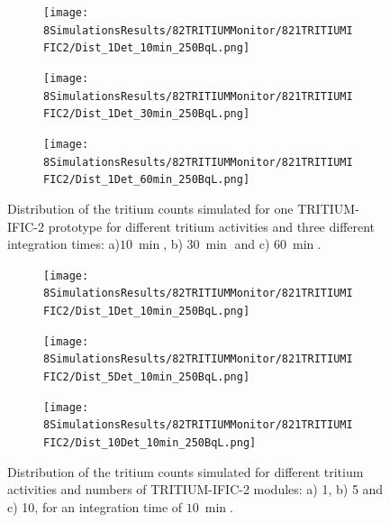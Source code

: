 \begin{figure}
\centering
    \begin{subfigure}[b]{0.6\textwidth}
    \centering
    \texttt{[image: 8SimulationsResults/82TRITIUMMonitor/821TRITIUMIFIC2/Dist\_1Det\_10min\_250BqL.png]}  
    \caption{\label{subfig:1Det10min250BqLST}}
    \end{subfigure}
    \hfill
    \begin{subfigure}[b]{0.6\textwidth}
    \centering
    \texttt{[image: 8SimulationsResults/82TRITIUMMonitor/821TRITIUMIFIC2/Dist\_1Det\_30min\_250BqL.png]}  
    \caption{\label{subfig:1Det30min250BqLST}}
    \end{subfigure}
    \hfill
    \begin{subfigure}[b]{0.6\textwidth}
    \centering
    \texttt{[image: 8SimulationsResults/82TRITIUMMonitor/821TRITIUMIFIC2/Dist\_1Det\_60min\_250BqL.png]}  
    \caption{\label{subfig:1Det60min250BqLST}}
    \end{subfigure}
 \caption{Distribution of the tritium counts simulated for one TRITIUM-IFIC-2 prototype for different tritium activities and three different integration times: a)$10~\min$, b) $30~\min$ and c) $60~\min$.}
 \label{fig:1Det250BqLseveralTimes}
\end{figure} 

\begin{figure}
\centering
    \begin{subfigure}[b]{0.6\textwidth}
    \centering
    \texttt{[image: 8SimulationsResults/82TRITIUMMonitor/821TRITIUMIFIC2/Dist\_1Det\_10min\_250BqL.png]}  
    \caption{\label{subfig:1Det10min250BqLSD}}
    \end{subfigure}
    \hfill
    \begin{subfigure}[b]{0.6\textwidth}
    \centering
    \texttt{[image: 8SimulationsResults/82TRITIUMMonitor/821TRITIUMIFIC2/Dist\_5Det\_10min\_250BqL.png]}  
    \caption{\label{subfig:5Det10min250BqLSD}}
    \end{subfigure}
    \hfill
    \begin{subfigure}[b]{0.6\textwidth}
    \centering
    \texttt{[image: 8SimulationsResults/82TRITIUMMonitor/821TRITIUMIFIC2/Dist\_10Det\_10min\_250BqL.png]}  
    \caption{\label{subfig:10Det10min250BqLSD}}
    \end{subfigure}
 \caption{Distribution of the tritium counts simulated for different tritium activities and numbers of TRITIUM-IFIC-2 modules: a) 1, b) 5 and c) 10, for an integration time of $10~\min$.}
 \label{fig:SeveralDet250BqL10min}
\end{figure}

